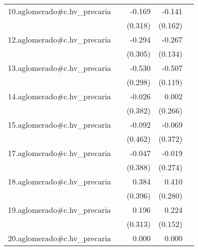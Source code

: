 {\begin{longtable}{l*{4}{D{.}{.}{-1}}}
\addlinespace
10.aglomerado#c.hv\_precaria&                     &      -0.169         &      -0.141         &                     \\
            &                     &     (0.318)         &     (0.162)         &                     \\
\addlinespace
12.aglomerado#c.hv\_precaria&                     &      -0.294         &      -0.267\sym{*}  &                     \\
            &                     &     (0.305)         &     (0.134)         &                     \\
\addlinespace
13.aglomerado#c.hv\_precaria&                     &      -0.530         &      -0.507\sym{***}&                     \\
            &                     &     (0.298)         &     (0.119)         &                     \\
\addlinespace
14.aglomerado#c.hv\_precaria&                     &      -0.026         &       0.002         &                     \\
            &                     &     (0.382)         &     (0.266)         &                     \\
\addlinespace
15.aglomerado#c.hv\_precaria&                     &      -0.092         &      -0.069         &                     \\
            &                     &     (0.462)         &     (0.372)         &                     \\
\addlinespace
17.aglomerado#c.hv\_precaria&                     &      -0.047         &      -0.019         &                     \\
            &                     &     (0.388)         &     (0.274)         &                     \\
\addlinespace
18.aglomerado#c.hv\_precaria&                     &       0.384         &       0.410         &                     \\
            &                     &     (0.396)         &     (0.280)         &                     \\
\addlinespace
19.aglomerado#c.hv\_precaria&                     &       0.196         &       0.224         &                     \\
            &                     &     (0.313)         &     (0.152)         &                     \\
\addlinespace
20.aglomerado#c.hv\_precaria&                     &       0.000         &       0.000         &                     \\

\end{longtable}}

